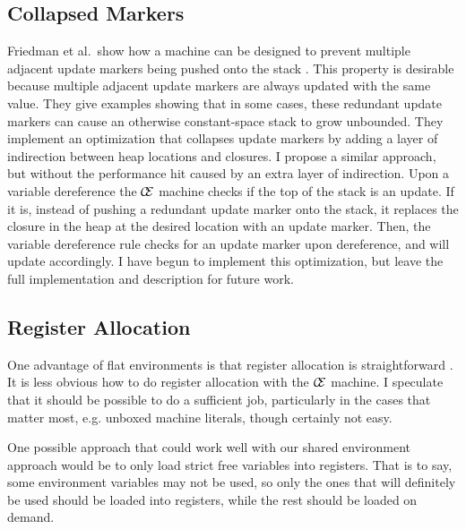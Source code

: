 \subsection{Collapsed Markers}
Friedman et al.\ show how a machine can be designed to prevent multiple adjacent
update markers being pushed onto the stack \cite{lkm}.  This property is
desirable because multiple adjacent update markers are always updated with the
same value. They give examples showing that in some cases, these redundant
update markers can cause an otherwise constant-space stack to grow unbounded.
They implement an optimization that collapses update markers by adding a layer
of indirection between heap locations and closures. I propose a similar
approach, but without the performance hit caused by an extra layer of
indirection. Upon a variable dereference the $\mathcal{\mathcal{C} \mskip -4mu
\mathcal{E}}$ machine checks if the top of the stack is an update. If it is,
instead of pushing a redundant update marker onto the stack, it replaces the
closure in the heap at the desired location with an update marker.  Then, the
variable dereference rule checks for an update marker upon dereference, and will
update accordingly. I have begun to implement this optimization, but leave the
full implementation and description for future work.

\subsection{Register Allocation} \label{sec:alloc}
One advantage of flat environments is that register allocation is
straightforward \cite{appel1992compiling,jonesstg,terei2010llvm}. It is less
obvious how to do register allocation with the $\mathcal{\mathcal{C} \mskip
-4mu \mathcal{E}}$ machine. I speculate that it should be possible to do a
sufficient job, particularly in the cases that matter most, e.g. unboxed
machine literals, though certainly not easy. 

One possible approach that could work well with our shared environment approach
would be to only load strict free variables into registers. That is to say, some
environment variables may not be used, so only the ones that will definitely be
used should be loaded into registers, while the rest should be loaded on demand. 

